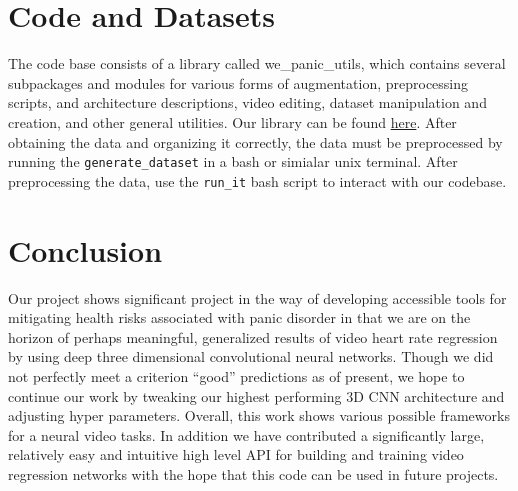 \documentclass{article}
\begin{document}
\section[4]{Code and Datasets}
\noindent The code base consists of a library called we\_panic\_utils, which contains several subpackages and modules for various forms of augmentation, preprocessing scripts, and architecture descriptions, video editing, dataset manipulation and creation, and other general utilities. Our library can be found \href{https://github.com/danielberenberg/DeepLearning-BloodData}{here}. After obtaining the data and organizing it correctly, the data must be preprocessed by running the \texttt{generate\_dataset} in a bash or simialar unix terminal. After preprocessing the data, use the \texttt{run\_it} bash script to interact with our codebase.
\section[5]{Conclusion}
Our project shows significant project in the way of developing accessible tools for mitigating health risks associated with panic disorder in that we are on the horizon of perhaps meaningful, generalized results of video heart rate regression by using deep three dimensional convolutional  neural networks. Though we did not perfectly meet a criterion ``good'' predictions as of present, we hope to continue our work by tweaking our highest performing 3D CNN architecture and adjusting hyper parameters. Overall, this work shows various possible frameworks for a neural video tasks. In addition we have contributed a significantly large, relatively easy and intuitive high level API for building and training video regression networks with the hope that this code can be used in future projects.
\newpage
\end{document}
